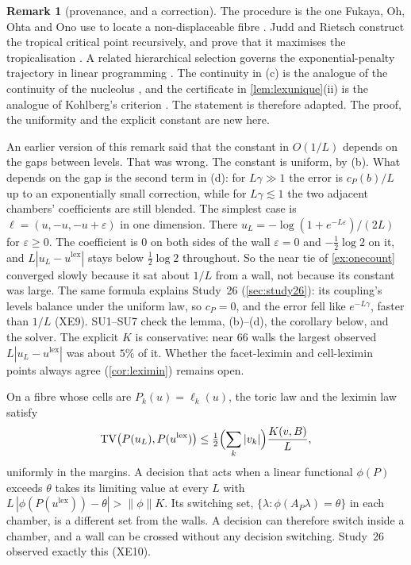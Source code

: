 \documentclass[11pt]{article}
\theoremstyle{definition}\newtheorem{definition}[theorem]{Definition}\newtheorem{remark}[theorem]{Remark}\newtheorem{example}[theorem]{Example}\newtheorem{problem}[theorem]{Open problem}\crefname{problem}{Problem}{Problems}
\begin{document}
\begin{remark}[provenance, and a correction]
The procedure is the one Fukaya, Oh, Ohta and Ono use to locate a non-displaceable fibre \cite{FOOO2010}. Judd and Rietsch construct the tropical critical point
recursively, and prove that it maximises the tropicalisation \cite{JuddRietsch2019}. A related hierarchical selection governs the exponential-penalty trajectory in linear
programming \cite{CominettiSanMartin1994}. The continuity in (c) is the analogue of the continuity of the nucleolus \cite{Schmeidler1969}, and the certificate in \cref{lem:lexunique}(ii) is the analogue of Kohlberg's criterion \cite{Kohlberg1971}. The statement is therefore adapted. The proof, the uniformity and the explicit constant are new here.

An earlier version of this remark said that the constant in $O(1/L)$ depends on the gaps between levels. That was wrong. The constant is uniform, by (b). What depends on the gap is the second term in (d): for $L\gamma\gg1$ the error is $c_P(b)/L$ up to an exponentially small correction, while for $L\gamma\lesssim1$ the two adjacent chambers' coefficients are still blended. The simplest case is $\ell=(u,-u,-u+\varepsilon)$ in one dimension. There $u_L=-\log(1+e^{-L\varepsilon})/(2L)$ for $\varepsilon\ge0$. The coefficient is $0$ on both sides of the wall $\varepsilon=0$ and $-\tfrac12\log2$ on it, and $L|u_L-u^{\mathrm{lex}}|$ stays below $\tfrac12\log2$ throughout. So the near tie of \cref{ex:onecount} converged slowly because it sat about $1/L$ from a wall, not because its constant was large. The same formula explains Study~26 (\cref{sec:study26}): its coupling's levels balance under the uniform law, so $c_P=0$, and the error fell like $e^{-L\gamma}$, faster than $1/L$ (XE9). SU1--SU7 check the lemma, (b)--(d), the corollary below, and the solver. The explicit $K$ is conservative: near $66$ walls the largest observed $L|u_L-u^{\mathrm{lex}}|$ was about $5\%$ of it. Whether the facet-leximin and cell-leximin points always agree (\cref{cor:leximin}) remains open.
\end{remark}

\begin{corollary}\label{cor:selectlaw}
On a fibre whose cells are $P_k(u)=\ell_k(u)$, the toric law and the leximin law satisfy
\[
\mathrm{TV}\bigl(P(u_L),P(u^{\mathrm{lex}})\bigr)\le\tfrac12\Bigl(\sum_k|v_k|\Bigr)\frac{K(v,B)}{L},
\]
uniformly in the margins. A decision that acts when a linear functional $\phi(P)$ exceeds $\theta$ takes its limiting value at every $L$ with $L\,|\phi(P(u^{\mathrm{lex}}))-\theta|>\|\phi\|K$. Its switching set, $\{\lambda:\phi(A_P\lambda)=\theta\}$ in each chamber, is a different set from the walls. A decision can therefore switch inside a chamber, and a wall can be crossed without any decision switching. Study~26 observed exactly this (XE10).
\end{corollary}
\end{document}
